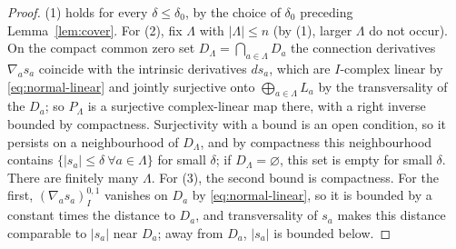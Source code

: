 \documentclass[12pt]{article}
\theoremstyle{remark}
\begin{document}
\begin{proof}
(1) holds for every $\delta\le\delta_0$, by the choice of $\delta_0$
preceding Lemma~\ref{lem:cover}. For (2), fix
$\Lambda$ with $|\Lambda|\le n$ (by (1), larger $\Lambda$ do not occur).
On the compact common zero set $D_\Lambda=\bigcap_{a\in\Lambda}D_a$ the
connection derivatives $\nabla_as_a$ coincide with the intrinsic
derivatives $ds_a$, which are $I$-complex linear by
\eqref{eq:normal-linear} and jointly surjective onto
$\bigoplus_{a\in\Lambda}L_a$ by the transversality of the $D_a$; so
$P_\Lambda$ is a surjective complex-linear map there, with a right
inverse bounded by compactness. Surjectivity with a bound is an open
condition, so it persists on a neighbourhood of $D_\Lambda$, and by
compactness this neighbourhood contains
$\{|s_a|\le\delta\ \forall a\in\Lambda\}$ for small $\delta$; if
$D_\Lambda=\varnothing$, this set is empty for small $\delta$. There are
finitely many $\Lambda$. For (3), the second bound is compactness.
For the first, $(\nabla_as_a)^{0,1}_I$ vanishes on $D_a$ by
\eqref{eq:normal-linear}, so it is bounded by a constant times the
distance to $D_a$, and transversality of $s_a$ makes this distance
comparable to $|s_a|$ near $D_a$; away from $D_a$, $|s_a|$ is bounded
below.
\end{proof}
\end{document}
